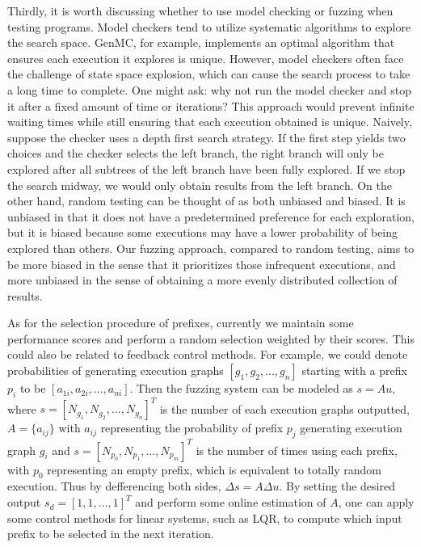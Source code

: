 Thirdly, it is worth discussing whether to use model checking or fuzzing when testing programs. Model checkers tend to utilize systematic algorithms to explore the search space. GenMC, for example, implements an optimal algorithm that ensures each execution it explores is unique. However, model checkers often face the challenge of state space explosion, which can cause the search process to take a long time to complete. One might ask: why not run the model checker and stop it after a fixed amount of time or iterations? This approach would prevent infinite waiting times while still ensuring that each execution obtained is unique.
Naively, suppose the checker uses a depth first search strategy. If the first step yields two choices and the checker selects the left branch, the right branch will only be explored after all subtrees of the left branch have been fully explored. If we stop the search midway, we would only obtain results from the left branch. On the other hand, random testing can be thought of as both unbiased and biased. It is unbiased in that it does not have a predetermined preference for each exploration, but it is biased because some executions may have a lower probability of being explored than others. Our fuzzing approach, compared to random testing, aims to be more biased in the sense that it prioritizes those infrequent executions, and more unbiased in the sense of obtaining a more evenly distributed collection of results.


As for the selection procedure of prefixes, currently we maintain some performance scores and perform a random selection weighted by their scores. This could also be related to feedback control methods. For example, we could denote probabilities of generating execution graphs \([g_1, g_2, ..., g_n ]\) starting with a prefix \(p_i\) to be \([a_{1i}, a_{2i}, ..., a_{ni}]\). Then the fuzzing system can be modeled as \(s = Au\), where $s = [N_{g_1}, N_{g_2}, ..., N_{g_n}]^T$ is the number of each execution graphs outputted, $A = \{ a_{ij} \}$ with $a_{ij}$ representing the probability of prefix $p_j$ generating execution graph $g_i$ and $s = [N_{p_0}, N_{p_1}, ..., N_{p_m}]^T$ is the number of times using each prefix, with $p_0$ representing an empty prefix, which is equivalent to totally random execution. Thus by defferencing both sides, $\Delta s = A \Delta u$. By setting the desired output $s_d = [1, 1, ..., 1]^T$ and perform some online estimation\cite{goodwinadaptive} of $A$, one can apply some control methods for linear systems, such as LQR\cite{lewis2012optimal}, to compute which input prefix to be selected in the next iteration.  



